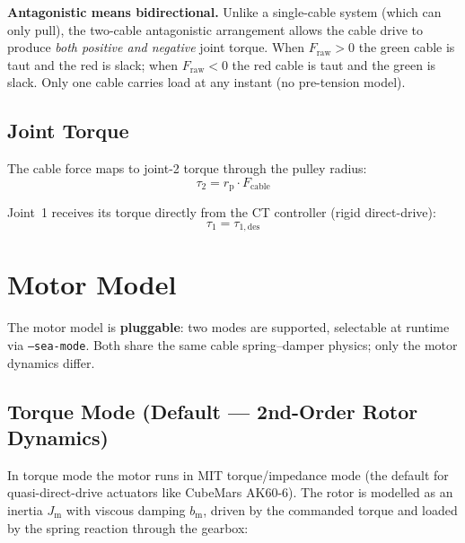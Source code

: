 \documentclass[11pt,a4paper]{article}
\newcommand{\rp}{r_{\mathrm{p}}}
\newcommand{\Jm}{J_{\mathrm{m}}}
\begin{document}
\begin{warnbox}
\textbf{Antagonistic means bidirectional.}  Unlike a single-cable system (which can only pull), the two-cable antagonistic arrangement allows the cable drive to produce \emph{both positive and negative} joint torque.  When $F_{\mathrm{raw}} > 0$ the green cable is taut and the red is slack; when $F_{\mathrm{raw}} < 0$ the red cable is taut and the green is slack.  Only one cable carries load at any instant (no pre-tension model).
\end{warnbox}


\subsection{Joint Torque}

The cable force maps to joint-2 torque through the pulley radius:
\begin{equation}
\boxed{\tau_2 = \rp \cdot F_{\mathrm{cable}}}
\label{eq:tau2}
\end{equation}

Joint~1 receives its torque directly from the CT controller (rigid direct-drive):
\begin{equation}
    \tau_1 = \tau_{1,\mathrm{des}}
\label{eq:tau1}
\end{equation}


\section{Motor Model}
\label{sec:motor}

The motor model is \textbf{pluggable}: two modes are supported, selectable at runtime via \texttt{--sea-mode}.  Both share the same cable spring--damper physics; only the motor dynamics differ.

\subsection{Torque Mode (Default --- 2nd-Order Rotor Dynamics)}
\label{sec:torque_mode}

In torque mode the motor runs in MIT torque/impedance mode (the default for quasi-direct-drive actuators like CubeMars AK60-6).  The rotor is modelled as an inertia $\Jm$ with viscous damping $b_{\mathrm{m}}$, driven by the commanded torque and loaded by the spring reaction through the gearbox:
\end{document}

